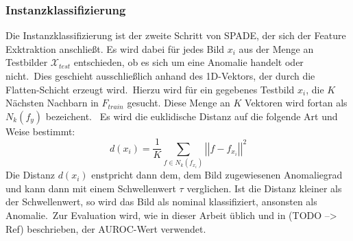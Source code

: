 \subsubsection*{Instanzklassifizierung}
Die Instanzklassifizierung ist der zweite Schritt von SPADE, der sich der Feature Exktraktion anschließt. Es wird dabei für jedes Bild $x_{i}$ aus der Menge an Testbilder $\mathcal{X}_{test}$ entschieden, ob es sich um eine Anomalie handelt oder nicht.\
Dies geschieht ausschließlich anhand des 1D-Vektors, der durch die \glqq Flatten\grqq{}-Schicht erzeugt wird.\
Hierzu wird für ein gegebenes Testbild $x_{i}$, die $K$ Nächsten Nachbarn in $F_{train}$ gesucht. Diese Menge an $K$ Vektoren wird fortan als $N_{k}(f_{y})$ bezeichent. \
Es wird die euklidische Distanz auf die folgende Art und Weise bestimmt:
$$
d(x_{i}) = \frac{1}{K} \sum_{f\in N_{k}(f_{x_{i}})} \left|\left| f - f_{x_{i}} \right|\right|^{2}
$$
Die Distanz $d(x_{i})$ enstpricht dann dem, dem Bild zugewiesenen Anomaliegrad und kann dann mit einem Schwellenwert $\tau$ verglichen. Ist die Distanz kleiner als der Schwellenwert, so wird das Bild als nominal klassifiziert, ansonsten als Anomalie.\
Zur Evaluation wird, wie in dieser Arbeit üblich und in (TODO --> Ref) beschrieben, der AUROC-Wert verwendet.\
